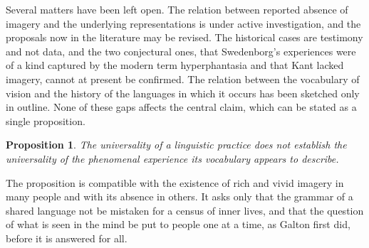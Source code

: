 \documentclass[11pt]{article}
\newtheorem{proposition}{Proposition}
\theoremstyle{remark}
\begin{document}
Several matters have been left open. The relation between reported absence of imagery and the underlying representations is under active investigation, and the proposals now in the literature may be revised. The historical cases are testimony and not data, and the two conjectural ones, that Swedenborg's experiences were of a kind captured by the modern term hyperphantasia and that Kant lacked imagery, cannot at present be confirmed. The relation between the vocabulary of vision and the history of the languages in which it occurs has been sketched only in outline. None of these gaps affects the central claim, which can be stated as a single proposition.

\begin{proposition}
The universality of a linguistic practice does not establish the universality of the phenomenal experience its vocabulary appears to describe.
\end{proposition}

The proposition is compatible with the existence of rich and vivid imagery in many people and with its absence in others. It asks only that the grammar of a shared language not be mistaken for a census of inner lives, and that the question of what is seen in the mind be put to people one at a time, as Galton first did, before it is answered for all.
\end{document}
